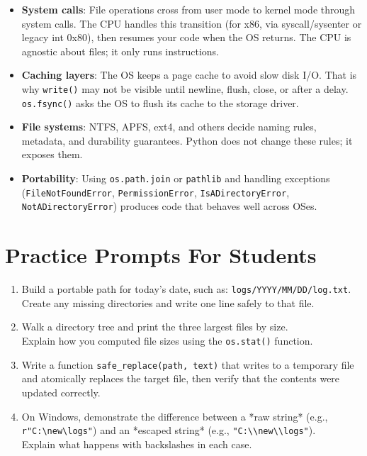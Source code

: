 \begin{itemize}
  \item \textbf{System calls}: File operations cross from user mode to kernel mode through system calls. The CPU handles this transition (for x86, via syscall/sysenter or legacy int 0x80), then resumes your code when the OS returns. The CPU is agnostic about files; it only runs instructions.
  \item \textbf{Caching layers}: The OS keeps a page cache to avoid slow disk I/O. That is why \texttt{write()} may not be visible until newline, flush, close, or after a delay. \texttt{os.fsync()} asks the OS to flush its cache to the storage driver.
  \item \textbf{File systems}: NTFS, APFS, ext4, and others decide naming rules, metadata, and durability guarantees. Python does not change these rules; it exposes them.
  \item \textbf{Portability}: Using \texttt{os.path.join} or \texttt{pathlib} and handling exceptions (\texttt{FileNotFoundError}, \texttt{PermissionError}, \texttt{IsADirectoryError}, \texttt{NotADirectoryError}) produces code that behaves well across OSes.
\end{itemize}

\section*{Practice Prompts For Students}

\begin{enumerate}
  \item Build a portable path for today's date, such as:
  \verb|logs/YYYY/MM/DD/log.txt|. \\
  Create any missing directories and write one line safely to that file.

  \item Walk a directory tree and print the three largest files by size. \\
  Explain how you computed file sizes using the \verb|os.stat()| function.

  \item Write a function \verb|safe_replace(path, text)| that writes to a temporary file
  and atomically replaces the target file, then verify that the contents were updated correctly.

  \item On Windows, demonstrate the difference between a *raw string*
  (e.g., \verb|r"C:\new\logs"|) and an *escaped string*
  (e.g., \verb|"C:\\new\\logs"|). \\
  Explain what happens with backslashes in each case.
\end{enumerate}

